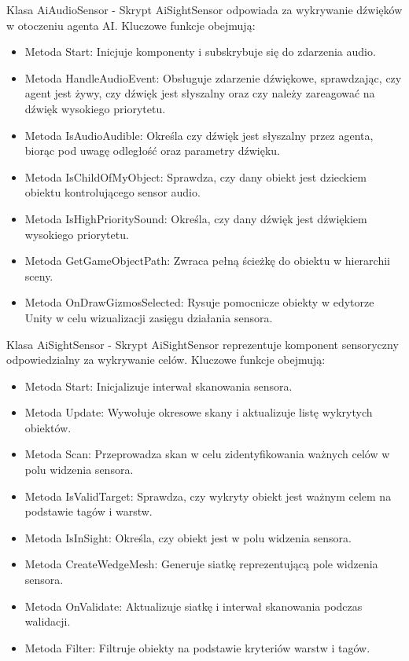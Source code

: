 Klasa AiAudioSensor -
Skrypt AiSightSensor odpowiada za wykrywanie dźwięków w otoczeniu agenta AI. Kluczowe funkcje obejmują:
\begin{itemize}
  \item Metoda Start: Inicjuje komponenty i subskrybuje się do zdarzenia audio.
  \item Metoda HandleAudioEvent: Obsługuje zdarzenie dźwiękowe, sprawdzając, czy agent jest żywy, czy dźwięk jest słyszalny oraz czy należy zareagować na dźwięk wysokiego priorytetu.
  \item Metoda IsAudioAudible: Określa czy dźwięk jest słyszalny przez agenta, biorąc pod uwagę odległość oraz parametry dźwięku.
  \item Metoda IsChildOfMyObject: Sprawdza, czy dany obiekt jest dzieckiem obiektu kontrolującego sensor audio.
  \item Metoda IsHighPrioritySound: Określa, czy dany dźwięk jest dźwiękiem wysokiego priorytetu.
  \item Metoda GetGameObjectPath: Zwraca pełną ścieżkę do obiektu w hierarchii sceny.
  \item Metoda OnDrawGizmosSelected: Rysuje pomocnicze obiekty w edytorze Unity w celu wizualizacji zasięgu działania sensora.
\end{itemize}

Klasa AiSightSensor -
Skrypt AiSightSensor reprezentuje komponent sensoryczny odpowiedzialny za wykrywanie celów. Kluczowe funkcje obejmują:
\begin{itemize}
  \item Metoda Start: Inicjalizuje interwał skanowania sensora.
  \item Metoda Update: Wywołuje okresowe skany i aktualizuje listę wykrytych obiektów.
  \item Metoda Scan: Przeprowadza skan w celu zidentyfikowania ważnych celów w polu widzenia sensora.
  \item Metoda IsValidTarget: Sprawdza, czy wykryty obiekt jest ważnym celem na podstawie tagów i warstw.
  \item Metoda IsInSight: Określa, czy obiekt jest w polu widzenia sensora.
  \item Metoda CreateWedgeMesh: Generuje siatkę reprezentującą pole widzenia sensora.
  \item Metoda OnValidate: Aktualizuje siatkę i interwał skanowania podczas walidacji.
  \item Metoda Filter: Filtruje obiekty na podstawie kryteriów warstw i tagów.
\end{itemize}

